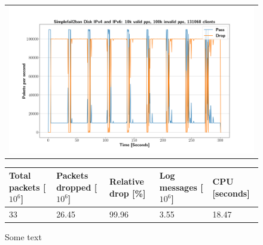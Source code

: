 \begin{figure}[p]
	\label{fig:simplefail2ban:disk:ip46:100k}
	\centering
	\scriptsize
	\begin{tabular}{c}
    	\centerline{\includegraphics[width=1.2\textwidth]{images/simplefail2ban_disk_ipv46_v10k_iv100k_c131068.png}}
	\end{tabular}
	\begin{tabular}{lllll}
		\toprule
		\textbf{Total packets [$10^6$]} & \textbf{Packets dropped [$10^6$]} & \textbf{Relative drop [\%]} & \textbf{Log messages [$10^6$]} & \textbf{CPU [seconds]} \\ \midrule 
		33 & 26.45 & 99.96 & 3.55 & 18.47 \\
	\bottomrule
	\end{tabular}
	\caption[Simplefail2ban Logfile IPv4 \& IPv6 100k PPS]{Some text}
\end{figure}

